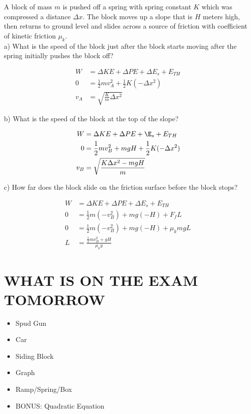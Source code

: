 \begin{problem}
    A block of mass $m$ is pushed off a spring with spring constant $K$ which was compressed a distance $\Delta x$. The block moves up a slope that is $H$ meters high, then returns to ground level and slides across a source of friction with coefficient of kinetic friction $\mu_k$. \\
    
    a) What is the speed of the block just after the block starts moving after the spring initially pushes the block off?
    
    $$
    \begin{aligned}
        W &= \Delta KE + \Delta PE + \Delta E_s + E_{TH}\\
        0 &= \frac{1}{2}mv_A^2 + \frac{1}{2}K(-\Delta x^2)\\
        v_A &= \sqrt{\frac{K}{m}\Delta x^2}
    \end{aligned}
    $$
    
    b) What is the speed of the block at the top of the slope?
    
    $$
    \begin{aligned}
        W &= \Delta KE + \Delta PE + \E_s + E_{TH}\\
        0 &= \frac{1}{2}mv_B^2+mgH + \frac{1}{2}K(-\Delta x^2)\\
        v_B &= \sqrt{\frac{K\Delta x^2 - mgH}{m}}
    \end{aligned}
    $$
    
    c) How far does the block slide on the friction surface before the block stops?
    
    $$
    \begin{aligned}
        W &= \Delta KE + \Delta PE + \Delta E_s + E_{TH}\\
        0 &= \frac{1}{2}m(-v_B^2) + mg(-H) + F_fL\\
        0 &= \frac{1}{2}m(-v_B^2) + mg(-H) + \mu_kmgL\\
        L &= \frac{\frac{1}{2}mv_B^2+gH}{\mu_kg}
    \end{aligned}
    $$
\end{problem}

\section{WHAT IS ON THE EXAM TOMORROW}

\begin{itemize}
    \item Spud Gun
    \item Car
    \item Siding Block
    \item Graph
    \item Ramp/Spring/Box
    \item BONUS: Quadratic Equation
\end{itemize}